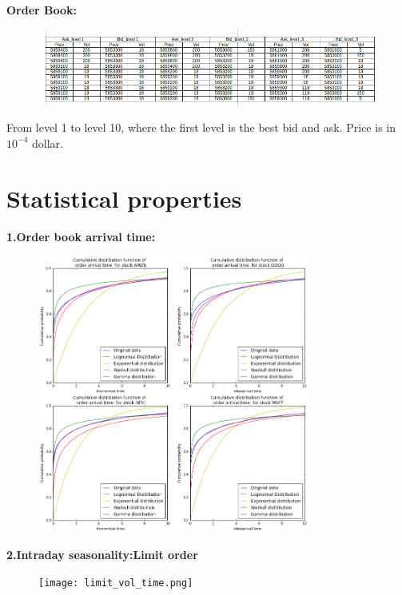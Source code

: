\documentclass[xcolor={x11names,svgnames,dvipsnames}]{beamer}
\begin{document}
\begin{frame}
	\textbf{Order Book:}
	\begin{figure}
		\includegraphics[width=1\textwidth, height=0.5\textheight]{order_book_new.png}
	\end{figure}
From level \alert{1 to level 10}, where the first level is the best bid and ask. Price is in \alert{$10^{-4}$} dollar.	
\end{frame}


\section{Statistical properties}

\begin{frame}
\textbf{1.Order book arrival time:}

\begin{figure}
		\includegraphics[width=0.8\textwidth, height=0.8\textheight]{arrival_time.png}
	\end{figure}
\end{frame}

\begin{frame}
\textbf{2.Intraday seasonality:Limit order}


\begin{figure}
		\texttt{[image: limit\_vol\_time.png]}
	\end{figure}
\end{frame}
\end{document}

